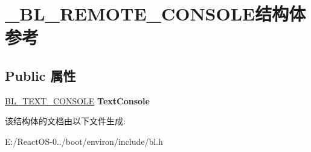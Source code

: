 \hypertarget{struct___b_l___r_e_m_o_t_e___c_o_n_s_o_l_e}{}\section{\+\_\+\+B\+L\+\_\+\+R\+E\+M\+O\+T\+E\+\_\+\+C\+O\+N\+S\+O\+L\+E结构体 参考}
\label{struct___b_l___r_e_m_o_t_e___c_o_n_s_o_l_e}
\subsection*{Public 属性}
\begin{DoxyCompactItemize}
\item 
\mbox{\label{struct___b_l___r_e_m_o_t_e___c_o_n_s_o_l_e_a4caffbb1d352d6f2020b0959644bb2f9}} 
\hyperlink{struct___b_l___t_e_x_t___c_o_n_s_o_l_e}{B\+L\+\_\+\+T\+E\+X\+T\+\_\+\+C\+O\+N\+S\+O\+LE} {\bfseries Text\+Console}
\end{DoxyCompactItemize}


该结构体的文档由以下文件生成\+:\begin{DoxyCompactItemize}
\item 
E\+:/\+React\+O\+S-\/0../boot/environ/include/bl.\+h\end{DoxyCompactItemize}

